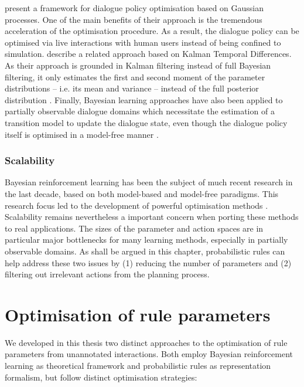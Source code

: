 \cite{gasic2011} present a framework for dialogue policy optimisation based on Gaussian processes. One of the main benefits of their approach is the tremendous acceleration of the optimisation procedure.  As a result, the dialogue policy can be optimised via live interactions with human users instead of being confined to simulation. \cite{Supelec808} describe a related approach based on Kalman Temporal Differences.  As their approach is grounded in Kalman filtering instead of full Bayesian filtering, it only estimates the first and second moment of the parameter distributions -- i.e. its mean and variance -- instead of the full posterior distribution \citep{DBLP:journals/jair/GeistP10}. Finally, Bayesian learning approaches have also been applied to partially observable dialogue domains which necessitate the estimation of a transition model to update the dialogue state, even though the dialogue policy itself is optimised in a model-free manner \citep{DBLP:conf/slt/ThomsonJGKMYY10}. 


\subsubsection*{Scalability}

Bayesian reinforcement learning has been the subject of much recent research in the last decade, based on both model-based and model-free paradigms. This research focus led to the development of powerful optimisation methods \cite[see e.g.][for a detailed survey]{brl2012}. Scalability remains nevertheless a important concern when porting these methods to real applications.  The sizes of the parameter and action spaces are in particular major bottlenecks for many learning methods, especially in partially observable domains. As shall be argued in this chapter, probabilistic rules can help address these two issues by (1) reducing the number of parameters and (2) filtering out irrelevant actions from the planning process.  

\section{Optimisation of rule parameters}
\label{sec:rl-ruleparams}

We developed in this thesis two distinct approaches to the optimisation of rule parameters from unannotated interactions. Both employ Bayesian reinforcement learning as theoretical framework and probabilistic rules as representation formalism, but follow distinct optimisation strategies:

